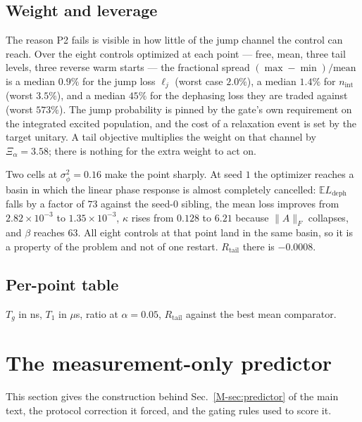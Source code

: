 \documentclass[aps,pra,onecolumn,notitlepage,superscriptaddress,nofootinbib,floatfix]{revtex4-2}
\newcommand{\E}{\mathbb{E}}
\newcommand{\Rt}{R_{\mathrm{tail}}}
\begin{document}
\subsection{Weight and leverage}
The reason P2 fails is visible in how little of the jump channel the control
can reach. Over the eight controls optimized at each point --- free, mean,
three tail levels, three reverse warm starts --- the fractional spread
$(\max-\min)/\mathrm{mean}$ is a median $0.9\%$ for the jump loss $\ell_j$
(worst case $2.0\%$), a median $1.4\%$ for $n_{\mathrm{int}}$ (worst
$3.5\%$), and a median $45\%$ for the dephasing loss they are traded against
(worst $573\%$). The jump probability is pinned by the gate's own requirement
on the integrated excited population, and the cost of a relaxation event is
set by the target unitary. A tail objective multiplies the weight on that
channel by $\Xi_\alpha=3.58$; there is nothing for the extra weight to act on.

Two cells at $\sigma_\phi^2=0.16$ make the point sharply. At seed $1$ the
optimizer reaches a basin in which the linear phase response is almost
completely cancelled: $\E L_{\mathrm{deph}}$ falls by a factor of $73$ against
the seed-$0$ sibling, the mean loss improves from $2.82\times10^{-3}$ to
$1.35\times10^{-3}$, $\kappa$ rises from $0.128$ to $6.21$ because $\|A\|_F$
collapses, and $\beta$ reaches $63$. All eight controls at that point land in
the same basin, so it is a property of the problem and not of one restart.
$\Rt$ there is $-0.0008$.

\subsection{Per-point table}
$T_g$ in ns, $T_1$ in $\mu$s, ratio at $\alpha=0.05$, $\Rt$ against the best
mean comparator.
\begin{center}\footnotesize\setlength{\tabcolsep}{4pt}

\end{center}

\section{The measurement-only predictor}
\label{sec:s13}

This section gives the construction behind Sec.~\ref{M-sec:predictor} of the
main text, the protocol correction it forced, and the gating rules used to
score it.
\end{document}
